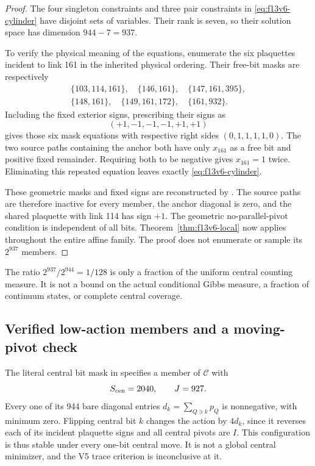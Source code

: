\documentclass[11pt,oneside]{article}
\begin{document}
\begin{proof}
The four singleton constraints and three pair
constraints in \eqref{eq:f13v6-cylinder} have
disjoint sets of variables. Their rank is seven,
so their solution space has dimension \(944-7=937\).

To verify the physical meaning of the equations,
enumerate the six plaquettes incident to link
161 in the inherited physical ordering. Their
free-bit masks are respectively
\[
\begin{gathered}
 \{103,114,161\},\quad\{146,161\},\quad
 \{147,161,395\},\\
 \{148,161\},\quad\{149,161,172\},\quad
 \{161,932\}.
\end{gathered}
\]
Including the fixed exterior signs, prescribing
their signs as
\[
 (+1,-1,-1,-1,+1,+1)
\]
gives those six mask equations with respective
right sides \((0,1,1,1,1,0)\).
The two source paths containing the anchor
both have only \(x_{161}\) as a free bit and
positive fixed remainder. Requiring both to
be negative gives \(x_{161}=1\) twice.
Eliminating this repeated equation leaves
exactly \eqref{eq:f13v6-cylinder}.

These geometric masks and fixed signs are
reconstructed by
.
The source paths are therefore inactive for
every member, the anchor diagonal is zero,
and the shared plaquette with link 114 has
sign \(+1\). The geometric no-parallel-pivot
condition is independent of all bits.
Theorem~\ref{thm:f13v6-local} now applies
throughout the entire affine family. The
proof does not enumerate or sample its
\(2^{937}\) members.
\end{proof}

The ratio \(2^{937}/2^{944}=1/128\) is only
a fraction of the uniform central counting
measure. It is not a bound on the actual
conditional Gibbs measure, a fraction of
continuum states, or complete central coverage.

\subsection{Verified low-action members and a moving-pivot check}

The literal central bit mask in
specifies a member of \(\mathcal C\) with
\[
 S_{\rm cen}=2040,\qquad J=927 .
\]
Every one of its 944 bare diagonal entries
\(d_k=\sum_{Q\ni k}p_Q\) is nonnegative, with
minimum zero. Flipping central bit \(k\)
changes the action by \(4d_k\), since it
reverses each of its incident plaquette
signs and all central pivots are \(I\).
This configuration is thus stable under
every one-bit central move. It is not a
global central minimizer, and the V5
trace criterion is inconclusive at it.
\end{document}
